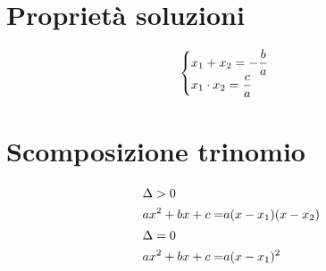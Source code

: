 \section{Proprietà soluzioni}
\begin{equation*}
\begin{cases}
x_1+x_2=-\dfrac{b}{a}\\
x_1\cdot x_2=\dfrac{c}{a}
\end{cases}\index{Equazione!secondo grado!somma soluzioni}\index{Equazione!secondo grado!prodotto soluzioni}
\end{equation*}
\section{Scomposizione trinomio}
\begin{align*}
\intertext{$\Delta>0$}
ax^2+bx+c=&a(x-x_1)(x-x_2)\\
\intertext{$\Delta=0$}
ax^2+bx+c=&a(x-x_1)^2
\end{align*}